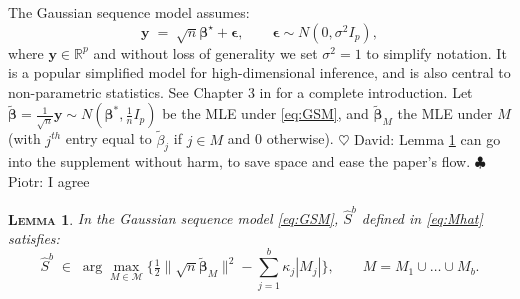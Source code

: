 \documentclass[aos]{imsart}
\theoremstyle{plain}
\newtheorem{lem}{\textsc{Lemma}}[section]
\newcommand{\david}[1]{{\small{\color{blue} \sf $\heartsuit$ David: #1}}}
\newcommand{\piotr}[1]{{\small{\color{red} \sf $\clubsuit$ Piotr: #1}}}
\newcommand{\bs}{\boldsymbol}
\begin{document}
The Gaussian sequence model assumes:
\begin{equation}\label{eq:GSM}
	\bs y \;=\; \sqrt{n} \bs \beta^{\star} + \bs\epsilon,\qquad \bs \epsilon \sim N(0,\sigma^2 I_p),
\end{equation}
where $\bs y \in \mathbb{R}^p$ and without loss of generality we set $\sigma^2=1$ to simplify notation. It is a popular simplified model for high-dimensional inference, and is also central to non-parametric statistics. See Chapter 3 in \cite{johnstone} for a complete introduction. 
Let $\tilde{\bs \beta}=\frac{1}{\sqrt{n}}\bs y \sim N(\bs \beta^*,\tfrac{1}{n}I_p)$ be the MLE under \eqref{eq:GSM}, and $\tilde{\bs \beta}_M$ the MLE under $M$ (with $j^{th}$ entry equal to $\tilde{\beta}_j$ if $j \in M$ and 0 otherwise).
\david{Lemma \ref{lem:useful-reformulation-GSM} can go into the supplement without harm, to save space and ease the paper's flow.}\piotr{I agree}
\begin{lem}\label{lem:useful-reformulation-GSM}
In the Gaussian sequence model \eqref{eq:GSM}, $\hat{S}^b$ defined in \eqref{eq:Mhat} satisfies:
    \begin{equation}\label{eq:MhatGSM}
  \hat S^b\;\in\;\arg\max_{M\in \mathcal{M}} \bigg\{\tfrac{1}{2}\| \sqrt{n}\tilde{\bs \beta}_M\|^2-\sum_{j=1}^b\kappa_j |M_j|\bigg\}, \qquad M=M_1\cup \ldots\cup M_b.	
\end{equation}
\end{lem}
\end{document}
